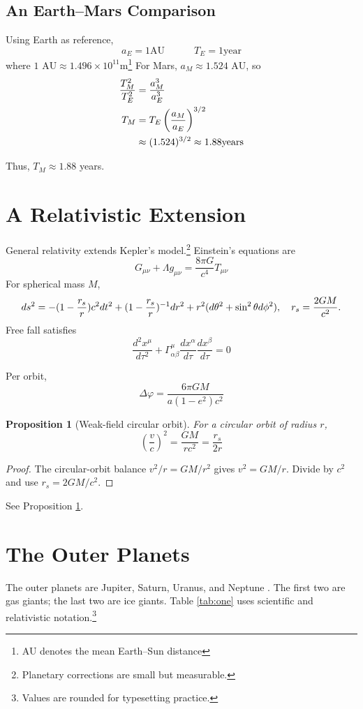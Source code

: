 \documentclass[11pt]{article}
\newtheorem{proposition}{Proposition}
\newcommand{\be}{\begin{equation}}
\newcommand{\ee}{\end{equation}}
\begin{document}
\subsection{An Earth–Mars Comparison}
Using Earth as reference,
\[
a_E = 1 \text{AU} \quad \quad \quad T_E = 1 \text{year}
\]
where $1 \text{ AU} \approx 1.496 \times 10^{11} \text{m}$\footnote{AU denotes the mean Earth–Sun distance} For Mars, $a_M \approx 1.524 \text{ AU}$, so
\begin{align}
\frac{T_M ^2}{T_E ^2} &= \frac{a_M^3}{a_E^3} \notag\\
   T_M &= T_E \left( \frac{a_M}{a_E}\right)^{3/2} \notag\\
    &\approx (1.524)^{3/2} \approx 1.88 \text{years} \notag
\end{align}


Thus, $T_M \approx 1.88$  years.

\section{A Relativistic Extension}
General relativity extends Kepler’s model.\footnote{Planetary corrections are small but measurable.} Einstein’s equations are
\be
G_{\mu \nu} + \Lambda g_{\mu\nu} = \frac{8\pi G}{c^4} T_{\mu\nu}
\ee
For spherical mass $M$,
\be
ds^2 = - (1-\frac{r_s}{r} )c^2 dt^2 + (1-\frac{r_s}{r} )^{-1}dr^2 \\
+ r^2 (d\theta^2 + \sin^2\theta d\phi^2), \quad r_s = \frac{2GM}{c^2}.
\ee
Free fall satisfies
\be
\frac{d^2 x^{\mu}}{d\tau^2} + \Gamma_{\alpha\beta}^{\mu} \frac{d x^{\alpha}}{d\tau} \frac{d x^{\beta}}{d\tau} = 0
\ee

Per orbit,
\be
\Delta \varphi = \frac{6\pi GM}{a(1-e^2)c^2}
\ee
\begin{proposition}[Weak-field circular orbit]
    For a circular orbit of radius $r$,
    \be
    (\frac{v}{c})^2 = \frac{GM}{rc^2} = \frac{r_s}{2r}
    \ee
    \label{prop:one}
\end{proposition}
\begin{proof}
    The circular-orbit balance $v^2/r = GM/r^2$ gives
    $v^2 = GM/r$. Divide by $c^2$ and use $r_s = 2GM/c^2$.
\end{proof}
See Proposition \ref{prop:one}.
\section{The Outer Planets}
The outer planets are Jupiter, Saturn, Uranus, and Neptune \cite{nasa_planets}. The first two
are gas giants; the last two are ice giants.
Table \ref{tab:one} uses scientific and relativistic notation.\footnote{Values are rounded for typesetting practice.}
\end{document}
